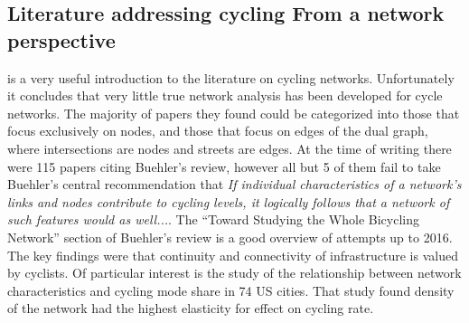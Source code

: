 \documentclass[11pt]{article} %
\begin{document}
%
%
%
%
%
%
%
%
%







\subsection{Literature addressing cycling From a network perspective}

\cite{buehler2016bikeway} is a very useful introduction to the literature on cycling networks. Unfortunately it concludes that very little true network analysis has been developed for cycle networks. The majority of papers they found could be categorized into those that focus exclusively on nodes, and those that focus on edges of the dual graph, where intersections are nodes and streets are edges. At the time of writing there were 115 papers citing Buehler's review, however all but 5 of them fail to take Buehler's central recommendation that \textit{If individual characteristics of a network's links and nodes contribute to cycling levels, it logically follows that a network of such features would as well...}. The ``Toward Studying the Whole Bicycling Network'' section of Buehler's review is a good overview of attempts up to 2016. The key findings were that continuity and connectivity of infrastructure is valued by cyclists. Of particular interest is the \cite{schoner2014missing} study of the relationship between network characteristics and cycling mode share in 74 US cities. That study found density of the network had the highest elasticity for effect on cycling rate. 
\end{document}
